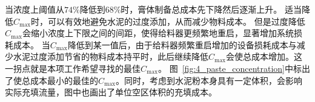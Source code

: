 当浓度上阈值从$74\%$降低到$68\%$时，膏体制备总成本先下降然后逐渐上升。
适当降低$C_{\max}$时，可以有效地避免水泥的过度添加，从而减少物料成本。
但是过度降低$C_{\max}$会缩小浓度上下限之间的间距，使得给料器更频繁地重启，显著增加系统损耗成本。
当$C_{\max}$降低到某一值后，由于给料器频繁重启增加的设备损耗成本与减少水泥过度添加节省的物料成本持平时，此后继续降低$C_{\max}$会使总成本增加。这一拐点就是本项工作希望寻找的最佳$C_{\max}$。
图~\ref{fig:4_paste_concentration}中标出了使总成本最小的最佳的$C_{\max}$。同时，考虑到水泥粉本身具有一定体积，会影响实际充填流量，图中也画出了单位空区体积的充填成本。

